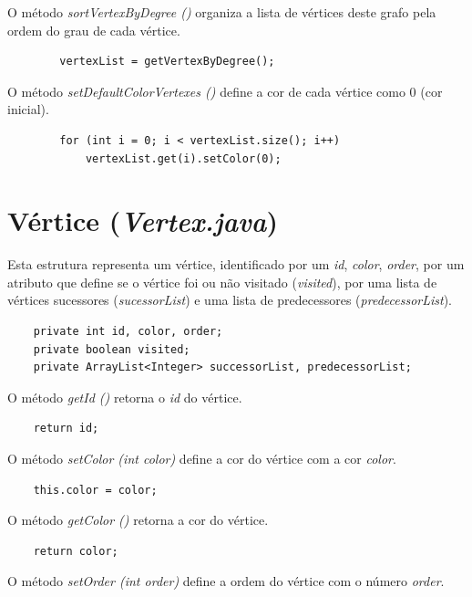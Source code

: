 \documentclass[a4paper,10pt]{report}
\begin{document}
O método \textit{sortVertexByDegree ()} organiza a lista de vértices deste grafo pela ordem do grau de cada vértice.

\begin{lstlisting}
        vertexList = getVertexByDegree();
\end{lstlisting}

O método \textit{setDefaultColorVertexes ()} define a cor de cada vértice como 0 (cor inicial).

\begin{lstlisting}
        for (int i = 0; i < vertexList.size(); i++)
            vertexList.get(i).setColor(0);
\end{lstlisting}

\section{Vértice (\textit{Vertex.java})}\label{vertex}

Esta estrutura representa um vértice, identificado por um \textit{id}, \textit{color}, \textit{order}, por um atributo que define se o vértice foi ou não visitado (\textit{visited}), por uma lista de vértices sucessores (\textit{sucessorList}) e uma lista de predecessores (\textit{predecessorList}).

\begin{lstlisting}
    private int id, color, order;
    private boolean visited;
    private ArrayList<Integer> successorList, predecessorList;
\end{lstlisting}

O método \textit{getId ()} retorna o \textit{id} do vértice.

\begin{lstlisting}
    return id;
\end{lstlisting}

O método \textit{setColor (int color)} define a cor do vértice com a cor \textit{color}.

\begin{lstlisting}
    this.color = color;
\end{lstlisting}

O método \textit{getColor ()} retorna a cor do vértice.

\begin{lstlisting}
    return color;
\end{lstlisting}

O método \textit{setOrder (int order)} define a ordem do vértice com o número \textit{order}.
\end{document}
